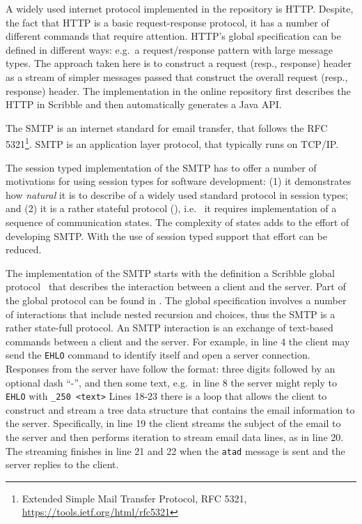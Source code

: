A widely used internet protocol implemented in the repository is HTTP.
Despite, the fact that HTTP is a basic request-response protocol,
it has a number of different commands that require attention.
HTTP's global specification can be defined in different ways:
e.g.~a request/response pattern with large message types. The approach
taken here is to construct a request (resp., response) header as
a stream of simpler messages passed that construct the overall
request (resp., response) header. The implementation in the online
repository first describes the HTTP in Scribble and then automatically
generates a Java API.
%

The SMTP is an internet standard for email
transfer, that follows the RFC 5321\footnote{Extended Simple Mail Transfer Protocol, RFC 5321,
\url{https://tools.ietf.org/html/rfc5321}}.
SMTP is an application layer protocol, that typically runs on
TCP/IP.

The session typed implementation of the SMTP has to offer
a number of motivations for using session types for software
development:
(1) it demonstrates how {\em natural} it is
to describe of a widely used standard protocol in session types; and
(2) it is a rather stateful protocol (),
i.e.~ it requires implementation of a sequence of communication states.
The complexity of states adds to the effort of
developing SMTP. With the use of session typed
support that effort can be reduced.

The implementation of the SMTP starts with
the definition a Scribble global protocol~\cite{HuR:smtp}
that describes the interaction between a client and the server.
Part of the global protocol can be found in .
The global specification involves a number of interactions
that include nested recursion and choices, thus the SMTP
is a rather state-full protocol.
%
An SMTP interaction is an exchange of text-based {commands}
between a client and the server.
%
For example, in line 4 the client may send the
\lstinline|EHLO| command to identify itself and open a server connection.
Responses from the server have follow  the format:
three digits followed by an optional dash ``-'', and then some text,
e.g.~in line 8 the server might reply to \lstinline|EHLO| with \lstinline|_250 <text>| %
Lines 18-23 there is a loop that allows the client to construct
and stream a tree data structure that contains the email information
to the server. Specifically, in line 19 the client streams the subject of the
email to the server and then performs iteration to stream email data lines,
as in line 20. The streaming finishes in line 21 and 22 when the
\lstinline|atad| message is sent and the server replies to the client.

